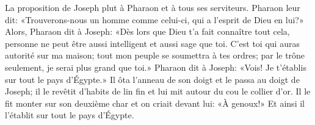La proposition de Joseph plut à Pharaon et à tous ses serviteurs.
Pharaon leur dit: «Trouverons-nous un homme comme celui-ci,
	qui a l’esprit de Dieu en lui?»
Alors, Pharaon dit à Joseph:
	«Dès lors que Dieu t’a fait connaître tout cela,
	personne ne peut être aussi intelligent et aussi sage que toi.
C’est toi qui auras autorité sur ma maison; tout mon peuple se soumettra à tes ordres;
	par le trône seulement, je serai plus grand que toi.»
Pharaon dit à Joseph: «Vois! Je t’établis sur tout le pays d’Égypte.»
Il ôta l’anneau de son doigt et le passa au doigt de Joseph;
	il le revêtit d’habits de lin fin et lui mit autour du cou le collier d’or.
Il le fit monter sur son deuxième char et on criait devant lui: «À genoux!»
	Et ainsi il l’établit sur tout le pays d’Égypte.
